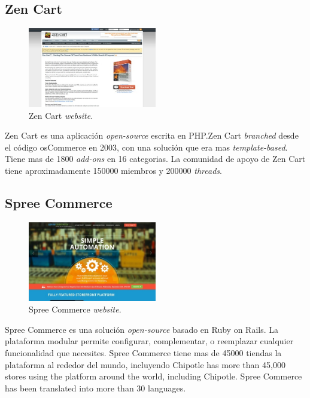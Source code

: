 \newcommand{\nameZenCart}{Zen Cart }
\subsection{\nameZenCart}

\begin{figure}[h!]
	\centering
	\includegraphics[width=0.5\textwidth]{figuras/cap1/ZenCartWebsite.jpg}
	\caption{\nameZenCart \textit{website}\cite{online_ZenCart}.}
\end{figure}

\nameZenCart es una aplicación \ecommerce \textit{open-source} escrita en PHP.\nameZenCart \textit{branched} desde el código osCommerce en 2003, con una solución que era mas \textit{template-based}. Tiene mas de 1800 \textit{add-ons} en 16 categorias. La comunidad de apoyo de \nameZenCart tiene aproximadamente 150000 miembros y 200000 \textit{threads}.

\newcommand{\nameSpreeCommerce}{Spree Commerce }
\subsection{\nameSpreeCommerce}

\begin{figure}[h!]
	\centering
	\includegraphics[width=0.5\textwidth]{figuras/cap1/SpreeCommerceWebsite.jpg}
	\caption{\nameSpreeCommerce \textit{website}\cite{online_SpreeCommerce}.}
\end{figure}

\nameSpreeCommerce es una solución \ecommerce \textit{open-source}  basado en Ruby on Rails. La plataforma modular permite configurar, complementar, o reemplazar cualquier funcionalidad que necesites. \nameSpreeCommerce tiene mas de 45000 tiendas la plataforma al rededor del mundo, incluyendo Chipotle\cite{online_Chipotle} has more than 45,000 stores using the platform around the world, including Chipotle. Spree Commerce has been translated into more than 30 languages.

